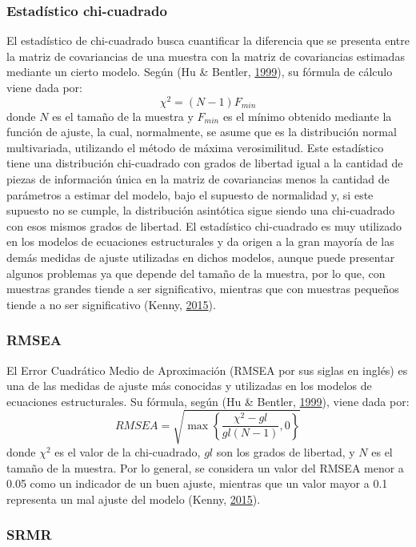 \documentclass[
]{article}
\begin{document}
\subsubsection{Estadístico chi-cuadrado}

El estadístico de chi-cuadrado busca cuantificar la diferencia que se
presenta entre la matriz de covariancias de una muestra con la matriz de
covariancias estimadas mediante un cierto modelo. Según (Hu \& Bentler,
\protect\hyperlink{ref-Hu1999}{1999}), su fórmula de cálculo viene dada
por: \[
  \chi^2 = (N-1) F_{min}
\] donde \(N\) es el tamaño de la muestra y \(F_{min}\) es el mínimo
obtenido mediante la función de ajuste, la cual, normalmente, se asume
que es la distribución normal multivariada, utilizando el método de
máxima verosimilitud. Este estadístico tiene una distribución
chi-cuadrado con grados de libertad igual a la cantidad de piezas de
información única en la matriz de covariancias menos la cantidad de
parámetros a estimar del modelo, bajo el supuesto de normalidad y, si
este supuesto no se cumple, la distribución asintótica sigue siendo una
chi-cuadrado con esos mismos grados de libertad. El estadístico
chi-cuadrado es muy utilizado en los modelos de ecuaciones estructurales
y da origen a la gran mayoría de las demás medidas de ajuste utilizadas
en dichos modelos, aunque puede presentar algunos problemas ya que
depende del tamaño de la muestra, por lo que, con muestras grandes
tiende a ser significativo, mientras que con muestras pequeños tiende a
no ser significativo (Kenny, \protect\hyperlink{ref-Kenny2015}{2015}).

\subsubsection{RMSEA}

El Error Cuadrático Medio de Aproximación (RMSEA por sus siglas en
inglés) es una de las medidas de ajuste más conocidas y utilizadas en
los modelos de ecuaciones estructurales. Su fórmula, según (Hu \&
Bentler, \protect\hyperlink{ref-Hu1999}{1999}), viene dada por: \[
  RMSEA = \sqrt{\max\left\{\frac{\chi^2 - gl}{gl (N-1)} , 0 \right\}}
\] donde \(\chi^2\) es el valor de la chi-cuadrado, \(gl\) son los
grados de libertad, y \(N\) es el tamaño de la muestra. Por lo general,
se considera un valor del RMSEA menor a 0.05 como un indicador de un
buen ajuste, mientras que un valor mayor a 0.1 representa un mal ajuste
del modelo (Kenny, \protect\hyperlink{ref-Kenny2015}{2015}).

\subsubsection{SRMR}
\end{document}
